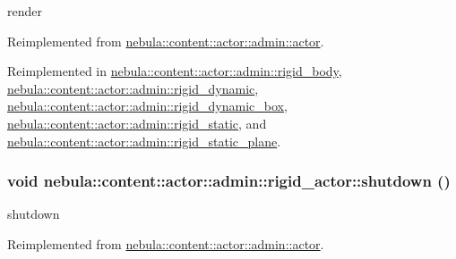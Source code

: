 render 

Reimplemented from \hyperlink{classnebula_1_1content_1_1actor_1_1admin_1_1actor_a1f4c2d9c8967293cad22dd8986e4886c}{nebula::content::actor::admin::actor}.

Reimplemented in \hyperlink{classnebula_1_1content_1_1actor_1_1admin_1_1rigid__body_a88b9c26608737c7850b4eef227548a59}{nebula::content::actor::admin::rigid\_\-body}, \hyperlink{classnebula_1_1content_1_1actor_1_1admin_1_1rigid__dynamic_a891dd9d18ef100af72427ebaea9e473a}{nebula::content::actor::admin::rigid\_\-dynamic}, \hyperlink{classnebula_1_1content_1_1actor_1_1admin_1_1rigid__dynamic__box_a7e5e4c2e52b7b02c7d667cb74926e8a2}{nebula::content::actor::admin::rigid\_\-dynamic\_\-box}, \hyperlink{classnebula_1_1content_1_1actor_1_1admin_1_1rigid__static_a574621febd60cbfd2949c00430d7f5f3}{nebula::content::actor::admin::rigid\_\-static}, and \hyperlink{classnebula_1_1content_1_1actor_1_1admin_1_1rigid__static__plane_ac4b170a8bd046d8a9b8822cfd9ce89e5}{nebula::content::actor::admin::rigid\_\-static\_\-plane}.\hypertarget{classnebula_1_1content_1_1actor_1_1admin_1_1rigid__actor_afe9a6592087cac6054f6416d7c617eaa}{
\subsubsection[{shutdown}]{\setlength{\rightskip}{0pt plus 5cm}void nebula::content::actor::admin::rigid\_\-actor::shutdown ()}}
\label{classnebula_1_1content_1_1actor_1_1admin_1_1rigid__actor_afe9a6592087cac6054f6416d7c617eaa}


shutdown 

Reimplemented from \hyperlink{classnebula_1_1content_1_1actor_1_1admin_1_1actor_a99f23953573c4f96672d9fb7b3cfe4fb}{nebula::content::actor::admin::actor}.

